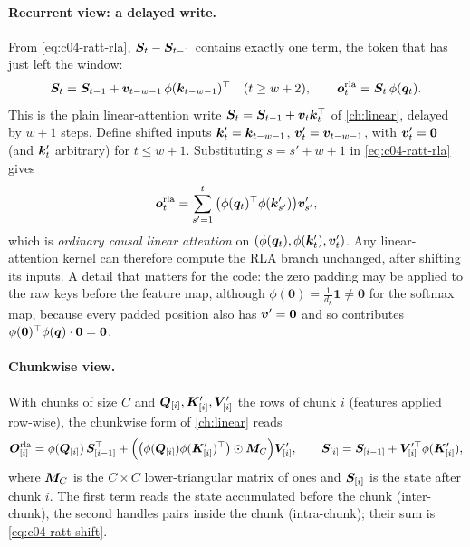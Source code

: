 \paragraph{Recurrent view: a delayed write.}
From \eqref{eq:c04-ratt-rla}, $\bm{S}_t-\bm{S}_{t-1}$ contains exactly one term, the token that has just
left the window:
\begin{equation}\label{eq:c04-ratt-recur}
  \bm{S}_t=\bm{S}_{t-1}+\bm{v}_{t-w-1}\,\phi(\bm{k}_{t-w-1})^{\top} \quad(t\ge w+2),\qquad \bm{o}^{\mathrm{rla}}_t=\bm{S}_t\,\phi(\bm{q}_t).
\end{equation}
This is the plain linear-attention write $\bm{S}_t=\bm{S}_{t-1}+\bm{v}_t\bm{k}_t^{\top}$ of \cref{ch:linear},
delayed by $w+1$ steps. Define shifted inputs $\bm{k}'_t=\bm{k}_{t-w-1}$, $\bm{v}'_t=\bm{v}_{t-w-1}$, with
$\bm{v}'_t=\mathbf{0}$ (and $\bm{k}'_t$ arbitrary) for $t\le w+1$. Substituting $s=s'+w+1$ in
\eqref{eq:c04-ratt-rla} gives
\begin{equation}\label{eq:c04-ratt-shift}
  \bm{o}^{\mathrm{rla}}_t=\sum_{s'=1}^{t}\big(\phi(\bm{q}_t)^{\top}\phi(\bm{k}'_{s'})\big)\bm{v}'_{s'} ,
\end{equation}
which is \emph{ordinary causal linear attention} on $(\phi(\bm{q}_t),\phi(\bm{k}'_t),\bm{v}'_t)$. Any
linear-attention kernel can therefore compute the RLA branch unchanged, after shifting its inputs.
A detail that matters for the code: the zero padding may be applied to the raw keys before the
feature map, although $\phi(\mathbf 0)=\tfrac{1}{d_k}\mathbf 1\ne\mathbf 0$ for the softmax map,
because every padded position also has $\bm{v}'=\mathbf 0$ and so contributes
$\phi(\mathbf 0)^{\top}\phi(\bm{q})\cdot\mathbf 0=\mathbf 0$.

\paragraph{Chunkwise view.}
With chunks of size $C$ and $\bm{Q}_{[i]},\bm{K}'_{[i]},\bm{V}'_{[i]}$ the rows of chunk $i$ (features
applied row-wise), the chunkwise form of \cref{ch:linear} reads
\begin{equation}\label{eq:c04-ratt-chunk}
  \bm{O}^{\mathrm{rla}}_{[i]}=\phi(\bm{Q}_{[i]})\,\bm{S}_{[i-1]}^{\top}+\Big(\big(\phi(\bm{Q}_{[i]})\phi(\bm{K}'_{[i]})^{\top}\big)\odot\bm{M}_C\Big)\bm{V}'_{[i]},\qquad
  \bm{S}_{[i]}=\bm{S}_{[i-1]}+\bm{V}'^{\top}_{[i]}\phi(\bm{K}'_{[i]}),
\end{equation}
where $\bm{M}_C$ is the $C\times C$ lower-triangular matrix of ones and $\bm{S}_{[i]}$ is the state after
chunk $i$. The first term reads the state accumulated before the chunk (inter-chunk), the second
handles pairs inside the chunk (intra-chunk); their sum is \eqref{eq:c04-ratt-shift}.

